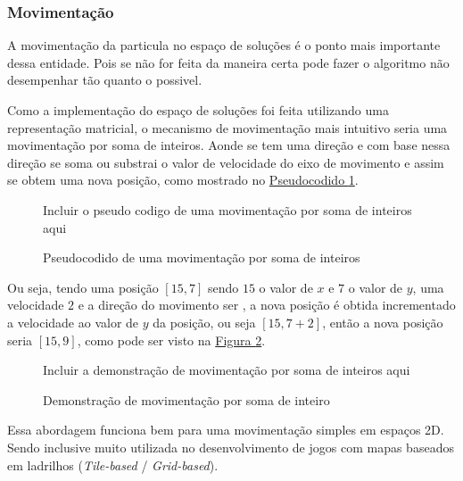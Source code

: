         \subsubsection{Movimentação}
            A movimentação da particula no espaço de soluções é o ponto mais importante dessa entidade. Pois se não for feita da maneira certa pode fazer o algoritmo não desempenhar tão quanto o possivel.\newline
            
            Como a implementação do espaço de soluções foi feita utilizando uma representação matricial, o mecanismo de movimentação mais intuitivo seria uma movimentação por soma de inteiros.\newline
            Aonde se tem uma direção e com base nessa direção se soma ou substrai o valor de velocidade do eixo de movimento e assim se obtem uma nova posição, como mostrado no 
            \hyperref[alg:mov-int-sum]{Pseudocodido \ref{alg:mov-int-sum}}.\newline

            \begin{figure}[h]
                \centering
                \small{Incluir o pseudo codigo de uma movimentação por soma de inteiros aqui}
                \caption{Pseudocodido de uma movimentação por soma de inteiros}
                \label{alg:mov-int-sum}
            \end{figure}
            
            Ou seja, tendo uma posição $[15, 7]$ sendo $15$ o valor de $x$ e $7$ o valor de $y$,
            uma velocidade $2$ e a direção do movimento ser , a nova posição é obtida incrementado a velocidade ao valor de $y$ da posição, ou seja $[15, 7+2]$, então a nova posição seria $[15, 9]$, como pode ser visto na 
            \hyperref[fig:movimentacao-int-sum]{Figura \ref{fig:movimentacao-int-sum}}.\newline
            
            \begin{figure}[h]
                \centering
                \small{Incluir a demonstração de movimentação por soma de inteiros aqui}
                \caption{Demonstração de movimentação por soma de inteiro}
                \label{fig:movimentacao-int-sum}
            \end{figure}
            
            Essa abordagem funciona bem para uma movimentação simples em espaços 2D. Sendo inclusive muito utilizada no desenvolvimento de jogos com mapas baseados em ladrilhos (\textit{Tile-based} / \textit{Grid-based}).\newline
            
